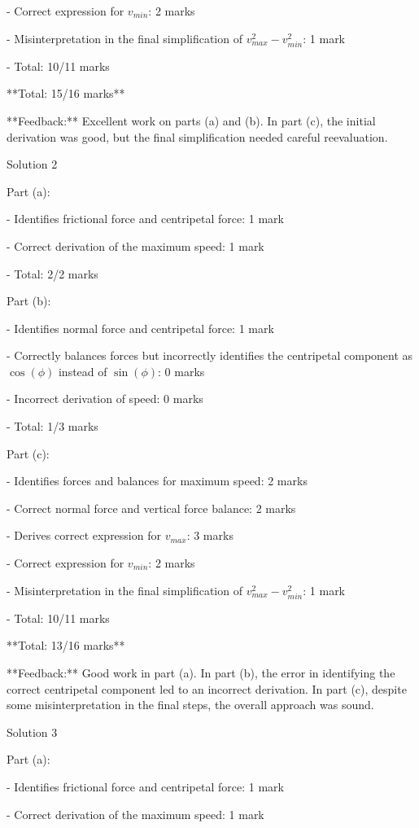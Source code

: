 \documentclass[a4paper,11pt]{article}
\begin{document}
- Correct expression for \( v_{min} \): 2 marks

- Misinterpretation in the final simplification of \( v_{max}^2 - v_{min}^2 \): 1 mark

- Total: 10/11 marks

**Total: 15/16 marks**

**Feedback:** Excellent work on parts (a) and (b). In part (c), the initial derivation was good, but the final simplification needed careful reevaluation.

Solution 2

Part (a): 

- Identifies frictional force and centripetal force: 1 mark

- Correct derivation of the maximum speed: 1 mark

- Total: 2/2 marks

Part (b): 

- Identifies normal force and centripetal force: 1 mark

- Correctly balances forces but incorrectly identifies the centripetal component as \( \cos(\phi) \) instead of \( \sin(\phi) \): 0 marks

- Incorrect derivation of speed: 0 marks

- Total: 1/3 marks

Part (c): 

- Identifies forces and balances for maximum speed: 2 marks

- Correct normal force and vertical force balance: 2 marks

- Derives correct expression for \( v_{max} \): 3 marks

- Correct expression for \( v_{min} \): 2 marks

- Misinterpretation in the final simplification of \( v_{max}^2 - v_{min}^2 \): 1 mark

- Total: 10/11 marks

**Total: 13/16 marks**

**Feedback:** Good work in part (a). In part (b), the error in identifying the correct centripetal component led to an incorrect derivation. In part (c), despite some misinterpretation in the final steps, the overall approach was sound.

Solution 3

Part (a): 

- Identifies frictional force and centripetal force: 1 mark

- Correct derivation of the maximum speed: 1 mark
\end{document}
